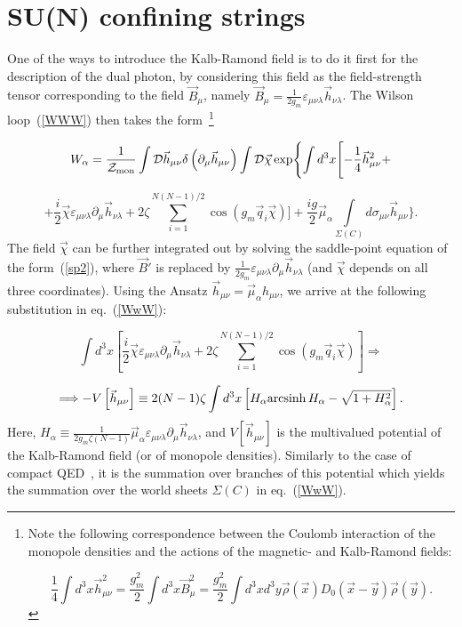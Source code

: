 \documentclass[a4paper,12pt]{article}
\begin{document}
\section{SU(N) confining strings}


One of the ways to introduce
the Kalb-Ramond field is to do it first for the description
of the dual photon, by considering this field as the field-strength
tensor corresponding to the field $\vec B_\mu$, namely $\vec B_\mu=\frac{1}{2g_m}\varepsilon_{\mu\nu\lambda}\vec h_{\nu\lambda}$.
The Wilson loop~(\ref{WWW}) then takes the form~\footnote{Note the following correspondence between the
Coulomb interaction of the monopole densities and the actions of the magnetic- and Kalb-Ramond fields:

$$
\frac14\int d^3x\vec h_{\mu\nu}^2=\frac{g_m^2}{2}\int d^3x\vec B_\mu^2=
\frac{g_m^2}{2}\int d^3x d^3y\vec\rho(\vec x)D_0(\vec x-\vec y)
\vec\rho(\vec y).$$}

$$
W_\alpha=
\frac{1}{{\cal Z}_{\rm mon}}
\int{\cal D}\vec h_{\mu\nu}\delta\left(\partial_\mu\vec h_{\mu\nu}\right)\int {\cal D}\vec\chi
\exp\Biggl\{\int d^3x\Biggl[-\frac14\vec h_{\mu\nu}^2+$$

\begin{equation}
\label{WwW}
+\frac{i}{2}\vec\chi\varepsilon_{\mu\nu\lambda}\partial_\mu\vec h_{\nu\lambda}+
2\zeta
\sum\limits_{i=1}^{N(N-1)/2}
\cos\left(g_m\vec q_i\vec\chi\right)\Biggr]+
\frac{ig}{2}\vec\mu_\alpha\int\limits_{\Sigma(C)}^{}d\sigma_{\mu\nu}\vec h_{\mu\nu}\Biggr\}.
\end{equation}
The field $\vec\chi$ can be further integrated out by solving the saddle-point equation of the form~(\ref{sp2}),
where $\vec B'$ is replaced by
$\frac{1}{2g_m}\varepsilon_{\mu\nu\lambda}\partial_\mu\vec h_{\nu\lambda}$ (and $\vec\chi$ depends on all three coordinates).
Using the Ansatz $\vec h_{\mu\nu}=\vec\mu_\alpha
h_{\mu\nu}$, we arrive at the following substitution in eq.~(\ref{WwW}):

$$
\int d^3x\left[\frac{i}{2}\vec\chi\varepsilon_{\mu\nu\lambda}\partial_\mu\vec h_{\nu\lambda}+
2\zeta
\sum\limits_{i=1}^{N(N-1)/2}
\cos\left(g_m\vec q_i\vec\chi\right)\right]\Longrightarrow$$

\begin{equation}
\label{Vh}
\Longrightarrow -V\left[\vec h_{\mu\nu}\right]\equiv2(N-1)\zeta\int d^3x \left[H_\alpha{\rm arcsinh}{\,} H_\alpha
-\sqrt{1+H_\alpha^2}\right].
\end{equation}
Here, $H_\alpha\equiv \frac{1}{2g_m\zeta (N-1)}\vec\mu_\alpha\varepsilon_{\mu\nu\lambda}\partial_\mu\vec h_{\nu\lambda}$, and
$V\left[\vec h_{\mu\nu}\right]$ is the
multivalued potential of the Kalb-Ramond field (or of monopole densities).
Similarly to the case of compact QED~\cite{pol}, it is the summation over branches of this potential which yields the
summation over the world sheets $\Sigma(C)$ in eq.~(\ref{WwW}).
\end{document}
